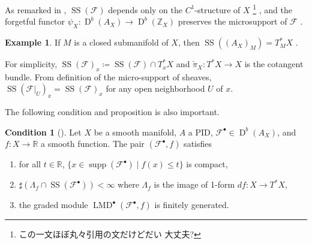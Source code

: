 \documentclass[a4paper,dvipdfmx,reqno,12pt]{amsart}
\theoremstyle{definition}
\newtheorem{example}[theorem]{Example}
\newtheorem{condition}[theorem]{Condition}
\newcommand{\deq}{\coloneqq}
\newcommand{\Z}{\mathbb{Z}}%
\newcommand{\mcal}[1]{\mathcal{#1}}%
\newcommand{\opn}[1]{\operatorname{#1}}
\numberwithin{equation}{section}
\begin{document}
As remarked in \cite[Remark 5.1.6]{MR1299726},
$\opn{SS}(\mcal{F})$ depends only on the 
$C^{1}$-structure of $X$ \footnote{この一文ほぼ丸々引用の文だけどだい
大丈夫?}
, and the forgetful functor 
$\psi_X \colon \opn{D}^{b}(A_X)\to \opn{D}^{b}(\Z_X)$
preserves the microsupport of $\mcal{F}$ 
\cite[Remark 5.1.5]{MR1299726}.

\begin{example}
If $M$ is a closed submanifold of $X$, then
$\opn{SS}((A_{X})_M)=T^{*}_M X$ \cite[Proposition 5.3.2]{MR1299726}.
\end{example}
For simplicity,
$\opn{SS}(\mcal{F})_x\deq \opn{SS}(\mcal{F}) 
\cap T^{*}_x X$ 
and $\check{\pi}_{X}\colon T^{*}X\to X$
is the cotangent bundle.
From definition of the micro-support of sheaves, 
$\opn{SS}(\mcal{F}|_{U})_x=\opn{SS}(\mcal{F})_x$
for any open neighborhood $U$ of $x$.





The following condition and proposition is also important.
\begin{condition}[{\cite[Proposition 5.4.20]{MR1299726}}]
\label{condition-global-morse}
Let $X$ be a smooth manifold, $A$ a PID, 
$\mathcal{F}^{\bullet}\in \opn{D}^{b}(A_X)$,
and $f\colon X\to \mathbb{R}$ a smooth function.
The pair $(\mathcal{F}^{\bullet},f)$ satisfies
\begin{enumerate}
\item for all $t\in \mathbb{R}$, 
$\{x\in\opn{supp}(\mathcal{F}^{\bullet})\mid f(x)\leq t\}$ 
is compact,
\item $\sharp (\Lambda_f\cap \opn{SS}(\mathcal{F}^{\bullet}))
<\infty$ where $\Lambda_f$ is the image of 1-form 
$df\colon X\to T^{*}X$,
\item the graded module 
$\opn{LMD}^{\bullet}(\mathcal{F}^{\bullet},f)$ 
is finitely generated.



\end{enumerate}

\end{condition}
\end{document}
